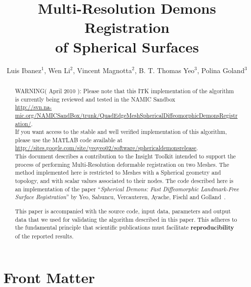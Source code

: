 \documentclass{InsightArticle}
\title{Multi-Resolution Demons Registration\\ of Spherical Surfaces}
\author{Luis Ibanez$^{1}$, Wen Li$^{2}$, Vincent Magnotta$^{2}$, B. T. Thomas Yeo$^{3}$, Polina Goland$^{3}$}
\newcommand{\IJhandlerIDnumber}{XXXX}
\begin{document}
%
% 
\IJhandlefooter{\IJhandlerIDnumber}


\ifpdf
\else
\fi


\maketitle


\ifhtml
\chapter*{Front Matter\label{front}}
\fi


\begin{abstract}
\noindent
WARNING( April 2010 ): Please note that this ITK implementation of the algorithm is
currently being reviewed and tested in the NAMIC Sandbox\\
\url{http://svn.na-mic.org/NAMICSandBox/trunk/QuadEdgeMeshSphericalDiffeomorphicDemonsRegistration/}.\\


If you want access to the stable and well verified implementation of this
algorithm, please use the MATLAB code available at\\
\url{http://sites.google.com/site/yeoyeo02/software/sphericaldemonsrelease}.\\


This document describes a contribution to the Insight Toolkit intended to
support the process of performing Multi-Resolution deformable registration on
two Meshes. The method implemented here is restricted to Meshes with a
Spherical geometry and topology, and with scalar values associated to their
nodes. The code described here is an implementation of the paper
``\emph{Spherical Demons: Fast Diffeomorphic Landmark-Free Surface
Registration}'' by Yeo, Sabuncu, Vercauteren, Ayache, Fischl and
Golland~\cite{Yeo2008,Yeo2009}.

This paper is accompanied with the source code, input data, parameters and
output data that we used for validating the algorithm described in this paper.
This adheres to the fundamental principle that scientific publications must
facilitate \textbf{reproducibility} of the reported results.
\end{abstract}
\end{document}
